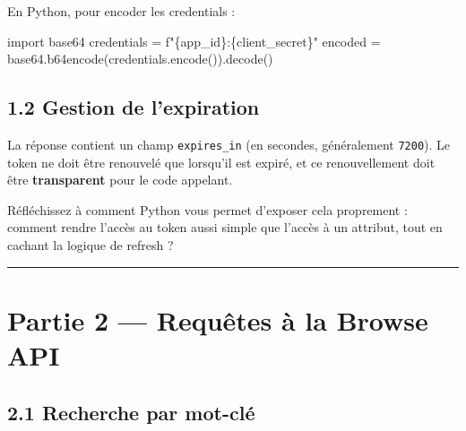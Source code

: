 \documentclass[
  french,
  letterpaper,
  DIV=11,
  numbers=noendperiod]{scrartcl}
\newenvironment{Shaded}{\begin{snugshade}}{\end{snugshade}}
\newcommand{\ImportTok}[1]{\textcolor[rgb]{0.00,0.46,0.62}{#1}}
\newcommand{\NormalTok}[1]{\textcolor[rgb]{0.00,0.23,0.31}{#1}}
\newcommand{\OperatorTok}[1]{\textcolor[rgb]{0.37,0.37,0.37}{#1}}
\newcommand{\SpecialCharTok}[1]{\textcolor[rgb]{0.37,0.37,0.37}{#1}}
\newcommand{\SpecialStringTok}[1]{\textcolor[rgb]{0.13,0.47,0.30}{#1}}
\begin{document}
\begin{tcolorbox}[enhanced jigsaw, toptitle=1mm, arc=.35mm, colbacktitle=quarto-callout-tip-color!10!white, title=\textcolor{quarto-callout-tip-color}{\faLightbulb}\hspace{0.5em}{Encodage Base64}, titlerule=0mm, toprule=.15mm, rightrule=.15mm, leftrule=.75mm, breakable, left=2mm, opacityback=0, coltitle=black, bottomrule=.15mm, colframe=quarto-callout-tip-color-frame, bottomtitle=1mm, colback=white, opacitybacktitle=0.6]

En Python, pour encoder les credentials :

\begin{Shaded}
\begin{Highlighting}[]
\ImportTok{import}\NormalTok{ base64}
\NormalTok{credentials }\OperatorTok{=} \SpecialStringTok{f"}\SpecialCharTok{\{}\NormalTok{app\_id}\SpecialCharTok{\}}\SpecialStringTok{:}\SpecialCharTok{\{}\NormalTok{client\_secret}\SpecialCharTok{\}}\SpecialStringTok{"}
\NormalTok{encoded }\OperatorTok{=}\NormalTok{ base64.b64encode(credentials.encode()).decode()}
\end{Highlighting}
\end{Shaded}

\end{tcolorbox}

\subsection{1.2 Gestion de l'expiration}\label{gestion-de-lexpiration}

La réponse contient un champ \texttt{expires\_in} (en secondes,
généralement \texttt{7200}). Le token ne doit être renouvelé que
lorsqu'il est expiré, et ce renouvellement doit être
\textbf{transparent} pour le code appelant.

Réfléchissez à comment Python vous permet d'exposer cela proprement :
comment rendre l'accès au token aussi simple que l'accès à un attribut,
tout en cachant la logique de refresh ?

\begin{center}\rule{0.5\linewidth}{0.5pt}\end{center}

\section{Partie 2 --- Requêtes à la Browse
API}\label{partie-2-requuxeates-uxe0-la-browse-api}

\subsection{2.1 Recherche par mot-clé}\label{recherche-par-mot-cluxe9}
\end{document}
